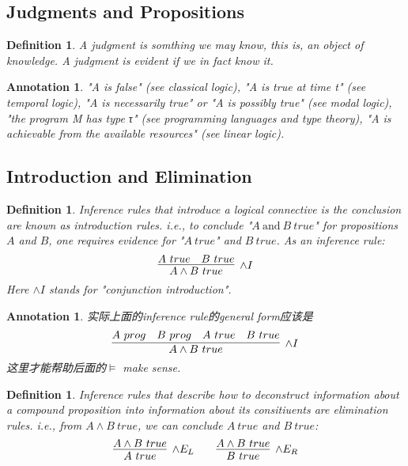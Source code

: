 \documentclass{article}
\theoremstyle{plain}
\newtheorem{definition}[theorem]{Definition}
\newtheorem{annotation}[theorem]{Annotation}
\theoremstyle{nonumberplain}
\begin{document}
\subsection{Judgments and Propositions}

\begin{definition}
\rm A \emph{judgment} is somthing we may know, this is, an object of knowledge. A judgment is \emph{evident} if we in fact know it.
\end{definition}

\begin{annotation}
\rm "A is false" (see classical logic), "A is true at time t" (see temporal logic), "A is necessarily true" or "A is possibly true" (see modal logic), "the program M has type τ" (see programming languages and type theory), "A is achievable from the available resources" (see linear logic). 
\end{annotation}


\subsection{Introduction and Elimination}

\begin{definition}
\rm Inference rules that introduce a logical connective is the conclusion are known as \emph{introduction rules}. i.e., to conclude "$A~\text{and}~B~true$" for propositions $A$ and $B$, one requires evidence for "$A~true$" and $B~true$. As an inference rule:
$$
\infer[\wedge I]{A \wedge B ~true}{A~true & B~true}
$$
Here $\wedge I$ stands for "conjunction introduction".
\end{definition}

\begin{annotation}
\rm 实际上面的inference rule的general form应该是
$$
\infer[\wedge I]{A \wedge B ~true}{A~prog & B~prog & A~true & B~true}
$$
这里才能帮助后面的$\vDash$ make sense. 
\end{annotation}

\begin{definition}
\rm Inference rules that describe how to deconstruct information about a compound proposition into information about its consitiuents are elimination rules. i.e., from $A \wedge B~true$, we can conclude $A~true$ and $B~true$:
$$
\infer[\wedge E_L]{A~true}{A \wedge B ~true}~~~~~~\infer[\wedge E_R]{B~true}{A \wedge B ~true} 
$$
\end{definition}
\end{document}

